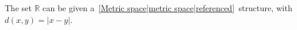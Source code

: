 
The set $\mathbb{R}$ can be given a \,\ref{Metric space|metric space|referenced}\, structure, with $d(x,y)=|x-y|$.

